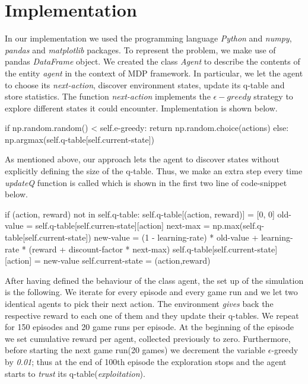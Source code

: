 \documentclass[10pt,a4paper,twocolumn]{article}
\newcommand\tab[1][0.5cm]{\hspace*{#1}}
\begin{document}
	\section{Implementation}
	
	In our implementation we used the programming language \textit{Python} and \textit{numpy}, \textit{pandas} and \textit{matplotlib} packages. To represent the problem, we make use of pandas \textit{DataFrame} object. We created the class \textit{Agent} to describe the contents of the entity \textit{agent}  in the context of MDP framework. In particular, we let the agent to choose its \textit{next-action}, discover environment states, update its q-table and store statistics. The function \textit{next-action} implements the \textit{$\epsilon-greedy$} strategy to explore different states it could encounter. Implementation is shown below.
	
	if np.random.random() < self.e-greedy:
	\newline \tab return np.random.choice(actions)
	\newline else:
	\newline \tab np.argmax(self.q-table[self.current-state])
	
	As mentioned above, our approach lets the agent to discover states without explicitly defining the size of the q-table. Thus, we make an extra step every time \textit{updateQ} function is called which is shown in the first two line of code-snippet below.
	
     if (action, reward) not in self.q-table:
     \newline \tab self.q-table[(action, reward)] = [0, 0]
     \newline
     \newline old-value = self.q-table[self.curren-state][action]
     \newline next-max = np.max(self.q-table[self.current-state])
	\newline
	\newline new-value = (1 - learning-rate) * old-value + learning-rate * (reward + discount-factor * next-max)
	\newline
	\newline self.q-table[self.current-state][action] = new-value
	\newline self.current-state = (action,reward)
	
	After having defined the behaviour of the class agent, the set up of the simulation is the following. We iterate for every episode and every game run and we let two identical agents to pick their next action. The environment \textit{gives} back the respective reward to each one of them and they update their q-tables. We repeat for 150 episodes and 20 game runs per episode. At the beginning of the episode we set cumulative reward per agent, collected previously to zero. Furthermore, before starting the next game run(20 games) we decrement the variable $\epsilon$-greedy by \textit{0.01}; thus at the end of 100th episode the exploration stops and the agent starts to \textit{trust} its q-table(\textit{exploitation}). 
	
\end{document}

